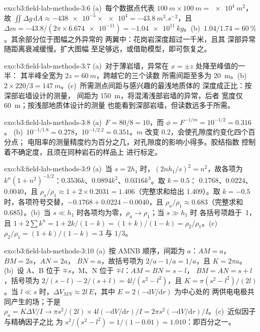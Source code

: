 \begin{solution}{exo:b3:field-lab-methods-3:6}
(a)~每个数据点代表 $\qty{100}{m}\times\qty{100}{m} =
\qty{e4}{m^2}$，故 $\iint\Delta g\,\mathrm{d}A \approx
\num{-438e-5}\times\num{e4} = \qty{-43.8}{m^3.s^{-2}}$，且 $\Delta m
= -43.8/(2\pi\times\num{6.674e-11}) = \qty{-1.04e11}{kg}$。(b)~$1.04/1.74
= \qty{60}{\percent}$。其余部分位于图幅之外异常的
两翼中：花岗岩深度超过一千米，且其
深部异常随距离衰减缓慢。扩大图幅
至足够远，或借助模型，即可恢复之。
\end{solution}

\begin{solution}{exo:b3:field-lab-methods-3:7}
(a)~对于薄岩墙，异常在 $x = \pm z$ 处降至峰值的一半：
其半峰全宽为 $2z = \qty{60}{m}$，跨越它的三个读数
所需间距至多为 \qty{20}{m}。(b)~$2\times
220/3 = \qty{147}{m}$。(c)~所需测点间距与感兴趣的最浅地质体的
深度成正比：按深部岩墙设计的测量，
间距为 \qty{150}{m}，将混淆浅部岩墙的异常，后者
宽度仅 \qty{60}{m}；按浅部地质体设计的测量
也能看到深部岩墙，但读数远多于所需。
\end{solution}

\begin{solution}{exo:b3:field-lab-methods-3:8}
(a)~$F = 80/8 = 10$，而 $\phi = F^{-1/m} = 10^{-1/2} = \num{0.316}$。
(b)~$10^{-1/1.8} = \num{0.278}$，$10^{-1/2.2} = \num{0.351}$。$m$ 改变
\num{0.2}，会使孔隙度约变化四个百分点；
电阻率的测量精度约为百分之几，对孔隙度的影响小得多。胶结指数
控制着不确定度，且须在同种岩石的样品上
进行标定。
\end{solution}

\begin{solution}{exo:b3:field-lab-methods-3:9}
(a)~当 $s = 2h_1$ 时，$(2nh_1/s)^2 = n^2$，故各项为 $k^n(1 +
n^2)^{-3/2}$：$0.3536k$、$0.0894k^2$、$0.0316k^3$。取 $k = 0.5$：
$\num{0.1768}$、$\num{0.0224}$、$\num{0.0040}$，且 $\rho_a/\rho_1 \approx
1 + 2\times0.2031 = \num{1.406}$（完整求和给出 \num{1.409}）。取 $k
= -0.5$ 时，各项符号交替，$-0.1768 + 0.0224 - 0.0040$，且
$\rho_a/\rho_1 \approx \num{0.683}$（完整求和 \num{0.685}）。(b)~当 $s \ll
h_1$ 时各项均为零，$\rho_a \to \rho_1$；当 $s \gg h_1$ 时
各括号项趋于~1，且 $1 + 2\sum k^n = 1 + 2k/(1 - k) = (1 + k)/(1 -
k) = \rho_2/\rho_1$。(c)~$\rho_2/\rho_1 = (1 + k)/(1 - k) = 3$ 与 $1/3$。
\end{solution}

\begin{solution}{exo:b3:field-lab-methods-3:10}
(a)~按 AMNB 顺序，间距为 $a$：$AM = a$，$BM = 2a$，$AN = 2a$，
$BN = a$，故括号项为 $2/a - 1/a = 1/a$，且 $K = 2\pi a$。
(b)~设 A、B 位于 $\mp s$，M、N 位于 $\mp l$：$AM = BN = s - l$，
$BM = AN = s + l$，括号项为 $2/(s - l) - 2/(s + l) = 4l/(s^2 -
l^2)$，且 $K = \pi(s^2 - l^2)/(2l)$。当 $l \ll s$ 时，$\Delta V_{MN}
\approx 2l\,E$，其中 $E = 2(-\mathrm{d}V/\mathrm{d}r)$ 为中心处的
两供电电极共同产生的场；于是 $\rho_a = K\Delta V/I \to
\pi s^2/(2l)\times 4l(-\mathrm{d}V/\mathrm{d}r)/I = 2\pi s^2(-
\mathrm{d}V/\mathrm{d}r)/I$。(c)~近似因子与精确因子之比
为 $s^2/(s^2 - l^2) = 1/(1 - 0.01) = 1.010$：即百分之一。
\end{solution}

